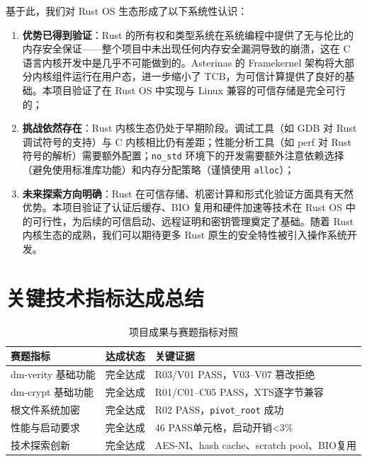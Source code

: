 基于此，我们对 Rust OS 生态形成了以下系统性认识：

\begin{enumerate}
    \item \textbf{优势已得到验证}：Rust 的所有权和类型系统在系统编程中提供了无与伦比的内存安全保证——整个项目中未出现任何内存安全漏洞导致的崩溃，这在 C 语言内核开发中是几乎不可能做到的。Asterinas 的 Framekernel 架构将大部分内核组件运行在用户态，进一步缩小了 TCB，为可信计算提供了良好的基础。本项目验证了在 Rust OS 中实现与 Linux 兼容的可信存储是完全可行的；
    
    \item \textbf{挑战依然存在}：Rust 内核生态仍处于早期阶段。调试工具（如 GDB 对 Rust 调试符号的支持）与 C 内核相比仍有差距；性能分析工具（如 perf 对 Rust 符号的解析）需要额外配置；\texttt{no\_std} 环境下的开发需要额外注意依赖选择（避免使用标准库功能）和内存分配策略（谨慎使用 \texttt{alloc}）；
    
    \item \textbf{未来探索方向明确}：Rust 在可信存储、机密计算和形式化验证方面具有天然优势。本项目验证了认证后缓存、BIO 复用和硬件加速等技术在 Rust OS 中的可行性，为后续的可信启动、远程证明和密钥管理奠定了基础。随着 Rust 内核生态的成熟，我们可以期待更多 Rust 原生的安全特性被引入操作系统开发。
\end{enumerate}

\section{关键技术指标达成总结}

\begin{table}[H]
    \centering
    \caption{项目成果与赛题指标对照}
    \begin{tabular}{p{}p{}p{}}
        \toprule
        \textbf{赛题指标} & \textbf{达成状态} & \textbf{关键证据} \\
        \midrule
        dm-verity 基础功能 & 完全达成 & R03/V01 PASS，V03--V07 篡改拒绝 \\
        dm-crypt 基础功能 & 完全达成 & R01/C01--C05 PASS，XTS逐字节兼容 \\
        根文件系统加密 & 完全达成 & R02 PASS，\texttt{pivot\_root} 成功 \\
        性能与启动要求 & 完全达成 & 46 PASS单元格，启动开销<3\% \\
        技术探索创新 & 完全达成 & AES-NI、hash cache、scratch pool、BIO复用 \\
        \bottomrule
    \end{tabular}
\end{table}

